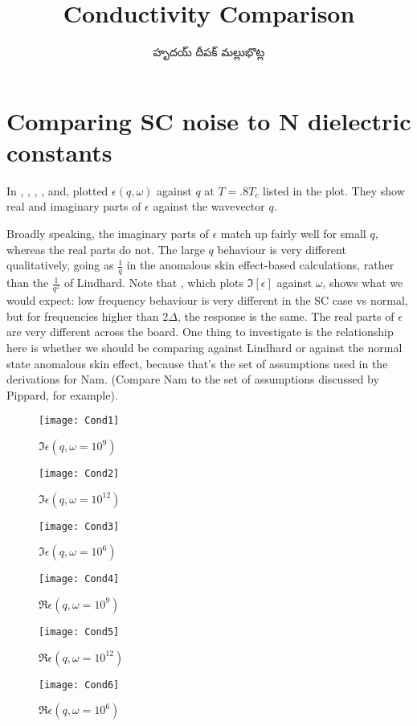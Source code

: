 \documentclass[../main.tex]{subfiles}
\title{Conductivity Comparison}
\author{\begin{telugu}హృదయ్ దీపక్ మల్లుభొట్ల\end{telugu}}
\date{}
\begin{document}
	\graphicspath{{\main/figures/}}
	\onlyinsubfile{\maketitle}

	\section{Comparing SC noise to N dielectric constants} \label{sec:intro}

	In , , , ,  and, plotted $\epsilon(q, \omega)$ against $q$ at $T = .8 T_c$ listed in the plot.
	They show real and imaginary parts of $\epsilon$ against the wavevector $q$.

	Broadly speaking, the imaginary parts of $\epsilon$ match up fairly well for small $q$, whereas the real parts do not.
	The large $q$ behaviour is very different qualitatively, going as $\frac{1}{q}$ in the anomalous skin effect-based calculations, rather than the $\frac{1}{q^2}$ of Lindhard.
	Note that , which plots $\Im[\epsilon]$ against $\omega$, shows what we would expect: low frequency behaviour is very different in the SC case vs normal, but for frequencies higher than $2 \Delta$, the response is the same.
	The real parts of $\epsilon$ are very different across the board.
	One thing to investigate is the relationship here is whether we should be comparing against Lindhard or against the normal state anomalous skin effect, because that's the set of assumptions used in the derivations for Nam.
	(Compare Nam\autocite{Nam1967} to the set of assumptions discussed by Pippard\autocite{Pippard}, for example).
	\begin{figure}[htp]
		\centering
		\texttt{[image: Cond1]}
		\caption{$\Im \epsilon(q, \omega = 10^9)$} \label{fig:1}
	\end{figure}
	\begin{figure}[htp]
		\centering
		\texttt{[image: Cond2]}
		\caption{$\Im \epsilon(q, \omega = 10^{12})$} \label{fig:2}
	\end{figure}
	\begin{figure}[htp]
		\centering
		\texttt{[image: Cond3]}
		\caption{$\Im \epsilon(q, \omega = 10^6)$} \label{fig:3}
	\end{figure}
	\begin{figure}[htp]
		\centering
		\texttt{[image: Cond4]}
		\caption{$\Re \epsilon(q, \omega = 10^9)$} \label{fig:4}
	\end{figure}
	\begin{figure}[htp]
		\centering
		\texttt{[image: Cond5]}
		\caption{$\Re \epsilon(q, \omega = 10^{12})$} \label{fig:5}
	\end{figure}
	\begin{figure}[htp]
		\centering
		\texttt{[image: Cond6]}
		\caption{$\Re \epsilon(q, \omega = 10^6)$} \label{fig:6}
	\end{figure}
\end{document}

